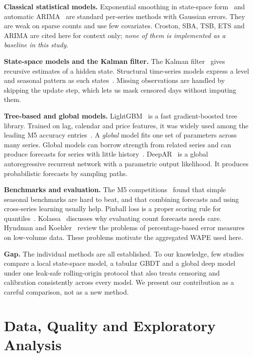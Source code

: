 \documentclass[conference]{IEEEtran}
\begin{document}
\textbf{Classical statistical models.} Exponential smoothing in state-space form~\cite{hyndman2002} and automatic ARIMA~\cite{hyndman2008} are standard per-series methods with Gaussian errors. They are weak on sparse counts and use few covariates. Croston, SBA, TSB, ETS and ARIMA are cited here for context only; \emph{none of them is implemented as a baseline in this study}.

\textbf{State-space models and the Kalman filter.} The Kalman filter~\cite{kalman1960} gives recursive estimates of a hidden state. Structural time-series models express a level and seasonal pattern as such states~\cite{harvey1989,durbin2012}. Missing observations are handled by skipping the update step, which lets us mask censored days without imputing them.

\textbf{Tree-based and global models.} LightGBM~\cite{ke2017} is a fast gradient-boosted tree library. Trained on lag, calendar and price features, it was widely used among the leading M5 accuracy entries~\cite{makridakis2022accuracy}. A \emph{global} model fits one set of parameters across many series. Global models can borrow strength from related series and can produce forecasts for series with little history~\cite{januschowski2020,montero2021}. DeepAR~\cite{salinas2020} is a global autoregressive recurrent network with a parametric output likelihood. It produces probabilistic forecasts by sampling paths.

\textbf{Benchmarks and evaluation.} The M5 competitions~\cite{makridakis2022accuracy,makridakis2022uncertainty} found that simple seasonal benchmarks are hard to beat, and that combining forecasts and using cross-series learning usually help. Pinball loss is a proper scoring rule for quantiles~\cite{gneiting2007}. Kolassa~\cite{kolassa2016} discusses why evaluating count forecasts needs care. Hyndman and Koehler~\cite{hyndman2006} review the problems of percentage-based error measures on low-volume data. These problems motivate the aggregated WAPE used here.

\textbf{Gap.} The individual methods are all established. To our knowledge, few studies compare a local state-space model, a tabular GBDT and a global deep model under one leak-safe rolling-origin protocol that also treats censoring and calibration consistently across every model. We present our contribution as a careful comparison, not as a new method.

\section{Data, Quality and Exploratory Analysis}\label{sec:data}
\end{document}
